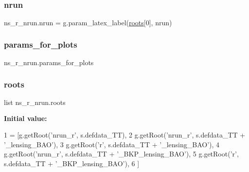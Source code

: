 \subsubsection{\texorpdfstring{nrun}{nrun}}
{\footnotesize\ttfamily ns\+\_\+r\+\_\+nrun.\+nrun = g.\+param\+\_\+latex\+\_\+label(\mbox{\hyperlink{namespacens__r__nrun_a720cd55efbb91a6c0ff15a598fd9541e}{roots}}\mbox{[}0\mbox{]}, \textquotesingle{}nrun\textquotesingle{})}

\mbox{\label{namespacens__r__nrun_aae65a65e20ca2b747da8781be6491252}} 
\subsubsection{\texorpdfstring{params\+\_\+for\+\_\+plots}{params\_for\_plots}}
{\footnotesize\ttfamily ns\+\_\+r\+\_\+nrun.\+params\+\_\+for\+\_\+plots}

\mbox{\label{namespacens__r__nrun_a720cd55efbb91a6c0ff15a598fd9541e}} 
\subsubsection{\texorpdfstring{roots}{roots}}
{\footnotesize\ttfamily list ns\+\_\+r\+\_\+nrun.\+roots}

{\bfseries Initial value\+:}
\begin{DoxyCode}
1 =  [g.getRoot(\textcolor{stringliteral}{'nrun\_r'}, s.defdata\_TT),
2          g.getRoot(\textcolor{stringliteral}{'nrun\_r'}, s.defdata\_TT + \textcolor{stringliteral}{'\_lensing\_BAO'}),
3          g.getRoot(\textcolor{stringliteral}{'r', s.defdata\_TT + '}\_lensing\_BAO'),
4          g.getRoot(\textcolor{stringliteral}{'nrun\_r'}, s.defdata\_TT + \textcolor{stringliteral}{'\_BKP\_lensing\_BAO'}),
5          g.getRoot(\textcolor{stringliteral}{'r', s.defdata\_TT + '}\_BKP\_lensing\_BAO'),
6          ]
\end{DoxyCode}
